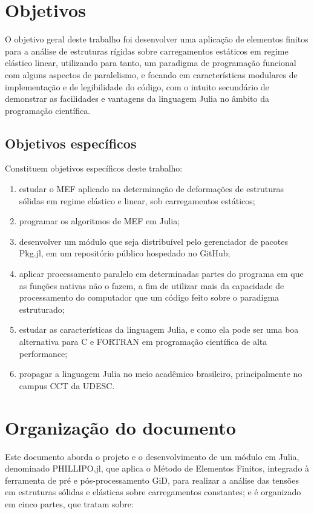 \section{Objetivos}

O objetivo geral deste trabalho foi desenvolver uma aplicação de elementos finitos para a análise de estruturas rígidas sobre carregamentos estáticos em regime elástico linear, utilizando para tanto, um paradigma de programação funcional com alguns aspectos de paralelismo, e focando em características modulares de implementação e de legibilidade do código, com o intuito secundário de demonstrar as facilidades e vantagens da linguagem Julia no âmbito da programação científica.

\subsection{Objetivos específicos}

Constituem objetivos específicos deste trabalho:

\begin{enumerate}
    \item estudar o MEF aplicado na determinação de deformações de estruturas sólidas em regime elástico e linear, sob carregamentos estáticos;
    \item programar os algoritmos de MEF em Julia;
    \item desenvolver um módulo que seja distribuível pelo gerenciador de pacotes Pkg.jl, em um repositório público hospedado no GitHub;
    \item aplicar processamento paralelo em determinadas partes do programa em que as funções nativas não o fazem, a fim de utilizar mais da capacidade de processamento do computador que um código feito sobre o paradigma estruturado;
    \item estudar as características da linguagem Julia, e como ela pode ser uma boa alternativa para C e FORTRAN em programação científica de alta performance;
    \item propagar a linguagem Julia no meio acadêmico brasileiro, principalmente no campus CCT da UDESC.
\end{enumerate}

\section{Organização do documento}

Este documento aborda o projeto e o desenvolvimento de um módulo em Julia, denominado PHILLIPO.jl, que aplica o Método de Elementos Finitos, integrado à ferramenta de pré e pós-processamento GiD, para realizar a análise das tensões em estruturas sólidas e elásticas sobre carregamentos constantes; e é organizado em cinco partes, que tratam sobre:

